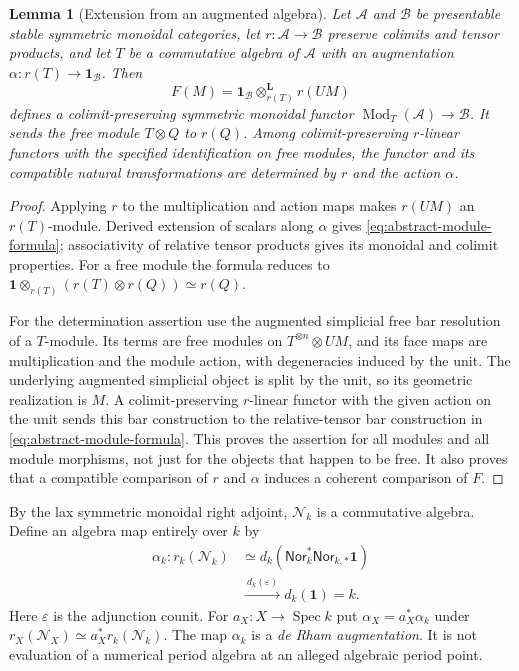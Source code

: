 \documentclass[11pt]{article}
\numberwithin{equation}{section}
\newtheorem{lemma}[lemma]{Lemma}
\theoremstyle{definition}
\theoremstyle{remark}
\newcommand{\Spec}{\operatorname{Spec}}
\newcommand{\one}{\mathbf1}
\begin{document}
\begin{lemma}[Extension from an augmented algebra]\label{lem:module-extension}
Let $\mathcal A$ and $\mathcal B$ be presentable stable symmetric monoidal
categories, let $r:\mathcal A\to\mathcal B$ preserve colimits and tensor
products, and let $T$ be a commutative algebra of $\mathcal A$ with an
augmentation $\alpha:r(T)\to\one_{\mathcal B}$. Then
\begin{equation}\label{eq:abstract-module-formula}
 F(M)=\one_{\mathcal B}\otimes^{\mathbf L}_{r(T)}r(UM)
\end{equation}
defines a colimit-preserving symmetric monoidal functor
$\operatorname{Mod}_{T}(\mathcal A)\to\mathcal B$. It sends the free
module $T\otimes Q$ to $r(Q)$. Among colimit-preserving $r$-linear functors with the specified
identification on free modules, the functor and its compatible natural
transformations are determined by $r$ and the action $\alpha$.
\end{lemma}
\begin{proof}
Applying $r$ to the multiplication and action maps makes $r(UM)$ an
$r(T)$-module. Derived extension of scalars along $\alpha$ gives
\eqref{eq:abstract-module-formula}; associativity of relative tensor
products gives its monoidal and colimit properties. For a free module the
formula reduces to
$\one\otimes_{r(T)}(r(T)\otimes r(Q))\simeq r(Q)$.

For the determination assertion use the augmented simplicial free bar
resolution of a $T$-module. Its terms are free modules on
$T^{\otimes n}\otimes UM$, and its face maps are multiplication and the
module action, with degeneracies induced by the unit. The underlying
augmented simplicial object is split by the unit, so its geometric
realization is $M$. A colimit-preserving $r$-linear functor with the given
action on the unit sends this bar construction to the relative-tensor
bar construction in \eqref{eq:abstract-module-formula}. This proves the
assertion for all modules and all module morphisms, not just for the
objects that happen to be free. It also proves that a compatible
comparison of $r$ and $\alpha$ induces a coherent comparison of $F$.
\end{proof}

By the lax symmetric monoidal right adjoint, $\mathscr N_k$ is a
commutative algebra. Define an algebra map entirely over $k$ by
\begin{equation}\label{eq:deRham-augmentation}
 \begin{split}
 \alpha_k:r_k(\mathscr N_k)
 &\simeq d_k(\mathsf{Nor}_k^*\mathsf{Nor}_{k,*}\one)\\
 &\xrightarrow{\ d_k(\varepsilon)\ }d_k(\one)=k.
 \end{split}
\end{equation}
Here $\varepsilon$ is the adjunction counit. For $a_X:X\to\Spec k$
put $\alpha_X=a_X^*\alpha_k$ under
$r_X(\mathscr N_X)\simeq a_X^*r_k(\mathscr N_k)$.
The map $\alpha_k$ is a \emph{de Rham augmentation}. It is not evaluation
of a numerical period algebra at an alleged algebraic period point.
\end{document}
